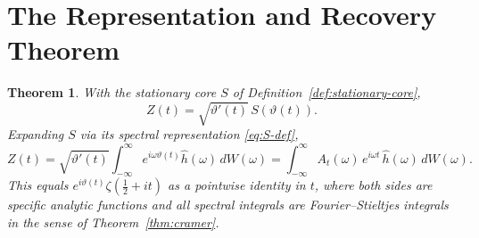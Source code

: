 \documentclass[11pt,a4paper]{article}
\newtheorem{theorem}{Theorem}
\begin{document}
\section{The Representation and Recovery Theorem}

\begin{theorem}
\label{thm:main}
With the stationary core $S$ of Definition~\ref{def:stationary-core},
\begin{equation}
  \label{eq:Zrep}
  Z(t)=\sqrt{\vartheta'(t)}\,S(\vartheta(t)).
\end{equation}
Expanding $S$ via its spectral representation \eqref{eq:S-def},
\begin{equation}
  \label{eq:Zfull}
  Z(t)=\sqrt{\vartheta'(t)}\int_{-\infty}^{\infty}
        e^{i\omega\vartheta(t)}\hat{h}(\omega)\,dW(\omega)
  =\int_{-\infty}^{\infty}A_t(\omega)\,e^{i\omega t}\,
   \hat{h}(\omega)\,dW(\omega).
\end{equation}
This equals $e^{i\vartheta(t)}\zeta(\tfrac{1}{2}+it)$ as a
pointwise identity in $t$, where both sides are specific analytic
functions and all spectral integrals are Fourier--Stieltjes integrals
in the sense of Theorem~\ref{thm:cramer}.
\end{theorem}
\end{document}
